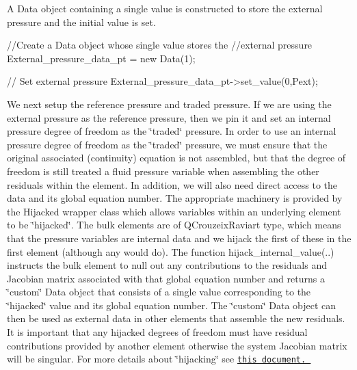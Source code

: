 A {\ttfamily Data} object containing a single value is constructed to store the external pressure and the initial value is set.


\begin{DoxyCodeInclude}

 \textcolor{comment}{//Create a Data object whose single value stores the}
 \textcolor{comment}{//external pressure}
 External\_pressure\_data\_pt = \textcolor{keyword}{new} Data(1);
 
 \textcolor{comment}{// Set external pressure}
 External\_pressure\_data\_pt->set\_value(0,Pext);

\end{DoxyCodeInclude}


\label{index_hijack}%
%
 We next setup the reference pressure and traded pressure. If we are using the external pressure as the reference pressure, then we pin it and set an internal pressure degree of freedom as the \char`\"{}traded\char`\"{} pressure. In order to use an internal pressure degree of freedom as the \char`\"{}traded\char`\"{} pressure, we must ensure that the original associated (continuity) equation is not assembled, but that the degree of freedom is still treated a fluid pressure variable when assembling the other residuals within the element. In addition, we will also need direct access to the data and its global equation number. The appropriate machinery is provided by the {\ttfamily Hijacked} wrapper class which allows variables within an underlying element to be \char`\"{}hijacked\char`\"{}. The bulk elements are of {\ttfamily Q\+Crouzeix\+Raviart} type, which means that the pressure variables are internal data and we hijack the first of these in the first element (although any would do). The function {\ttfamily hijack\+\_\+internal\+\_\+value}(..) instructs the bulk element to null out any contributions to the residuals and Jacobian matrix associated with that global equation number and returns a \char`\"{}custom\char`\"{} {\ttfamily Data} object that consists of a single value corresponding to the \char`\"{}hijacked\char`\"{} value and its global equation number. The \char`\"{}custom\char`\"{} {\ttfamily Data} object can then be used as external data in other elements that assemble the new residuals. It is important that any hijacked degrees of freedom must have residual contributions provided by another element otherwise the system Jacobian matrix will be singular. For more details about \char`\"{}hijacking\char`\"{} see \href{../../../hijacking/html/index.html}{\tt this document. }


